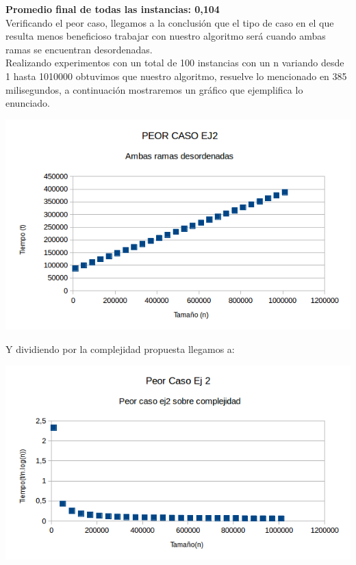 \textbf{Promedio final de todas las instancias: 0,104}\\

Verificando el peor caso, llegamos a la conclusi\'on que el tipo de caso en el que resulta menos beneficioso trabajar con nuestro algoritmo ser\'a cuando
ambas ramas se encuentran desordenadas.
\\

Realizando experimentos con un total de 100 instancias con un n variando desde 1 hasta 1010000 obtuvimos que nuestro
algoritmo, resuelve lo mencionado en 385 milisegundos, a continuaci\'on mostraremos un gr\'afico que ejemplifica lo enunciado.\\

\vspace*{0.3cm} \vspace*{0.3cm}
  \begin{center}
 \includegraphics[scale=0.8]{./EJ2/grafico2ejpeorcaso.png}
  \end{center}
  \vspace*{0.3cm}


Y dividiendo por la complejidad propuesta llegamos a:\\

\vspace*{0.3cm} \vspace*{0.3cm}
  \begin{center}
 \includegraphics[scale=0.8]{./EJ2/grafico2ejpeorcaso1.png}
  \end{center}
  \vspace*{0.3cm}

